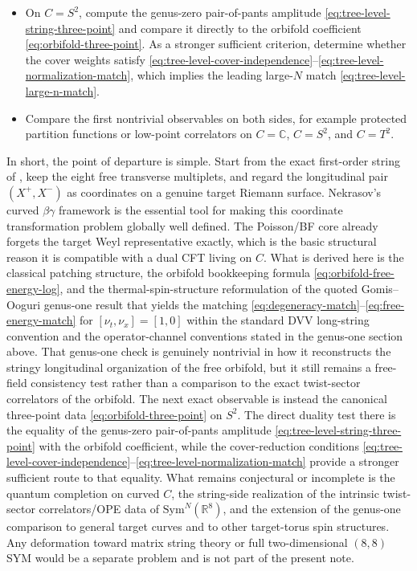 \documentclass[11pt]{article}
\newcommand{\Sym}{\mathrm{Sym}}
\newcommand{\bC}{\mathbb{C}}
\newcommand{\bR}{\mathbb{R}}
\begin{document}
\begin{itemize}
\item On $C=S^2$, compute the genus-zero pair-of-pants amplitude \eqref{eq:tree-level-string-three-point} and compare it directly to the orbifold coefficient \eqref{eq:orbifold-three-point}. As a stronger sufficient criterion, determine whether the cover weights satisfy \eqref{eq:tree-level-cover-independence}--\eqref{eq:tree-level-normalization-match}, which implies the leading large-$N$ match \eqref{eq:tree-level-large-n-match}.
\item Compare the first nontrivial observables on both sides, for example protected partition functions or low-point correlators on $C=\bC$, $C=S^2$, and $C=T^2$.
\end{itemize}

In short, the point of departure is simple. Start from the exact first-order string of \cite{gomis2000nonrelativisticclosedstringtheory}, keep the eight free transverse multiplets, and regard the longitudinal pair $(X^+,X^-)$ as coordinates on a genuine target Riemann surface. Nekrasov's curved $\beta\gamma$ framework \cite{nekrasov2005curvedbetagammasystems} is the essential tool for making this coordinate transformation problem globally well defined. The Poisson/BF core already forgets the target Weyl representative exactly, which is the basic structural reason it is compatible with a dual CFT living on $C$. What is derived here is the classical patching structure, the orbifold bookkeeping formula \eqref{eq:orbifold-free-energy-log}, and the thermal-spin-structure reformulation of the quoted Gomis--Ooguri genus-one result that yields the matching \eqref{eq:degeneracy-match}--\eqref{eq:free-energy-match} for $[\nu_t,\nu_x]=[1,0]$ within the standard DVV long-string convention and the operator-channel conventions stated in the genus-one section above. That genus-one check is genuinely nontrivial in how it reconstructs the stringy longitudinal organization of the free orbifold, but it still remains a free-field consistency test rather than a comparison to the exact twist-sector correlators of the orbifold. The next exact observable is instead the canonical three-point data \eqref{eq:orbifold-three-point} on $S^2$. The direct duality test there is the equality of the genus-zero pair-of-pants amplitude \eqref{eq:tree-level-string-three-point} with the orbifold coefficient, while the cover-reduction conditions \eqref{eq:tree-level-cover-independence}--\eqref{eq:tree-level-normalization-match} provide a stronger sufficient route to that equality. What remains conjectural or incomplete is the quantum completion on curved $C$, the string-side realization of the intrinsic twist-sector correlators/OPE data of $\Sym^N(\bR^8)$, and the extension of the genus-one comparison to general target curves and to other target-torus spin structures. Any deformation toward matrix string theory or full two-dimensional $(8,8)$ SYM would be a separate problem and is not part of the present note.

\printbibliography
\end{document}

